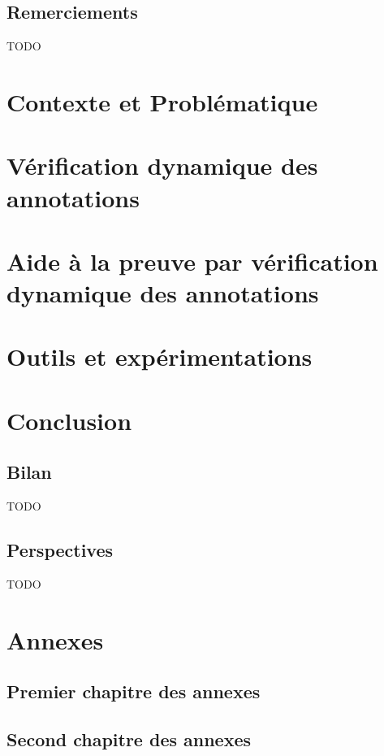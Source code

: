 \documentclass[french]{spimufcphdthesis}
\begin{document}
\chapter*{Remerciements}

TODO


\tableofcontents
\mainmatter


\part{Contexte et Problématique}




\part{Vérification dynamique des annotations}





\part{Aide à la preuve par vérification dynamique des annotations}





\part{Outils et expérimentations}




\part{Conclusion}
\chapter{Bilan}
TODO
\chapter{Perspectives}
TODO


\backmatter




\listoffigures
\listoftables
\listofdefinitions
\listofmypropertys

\appendix
\part{Annexes}

\chapter{Premier chapitre des annexes}
\chapter{Second chapitre des annexes}
\end{document}
